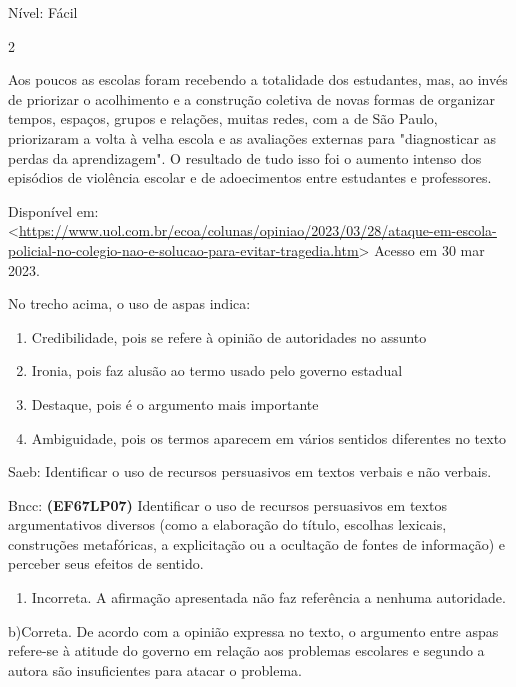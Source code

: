 {Nível: Fácil

\num{2}

Aos poucos as escolas foram recebendo a totalidade dos estudantes, mas,
ao invés de priorizar o acolhimento e a construção coletiva de novas
formas de organizar tempos, espaços, grupos e relações, muitas redes,
com a de São Paulo, priorizaram a volta à velha escola e as avaliações
externas para "diagnosticar as perdas da aprendizagem". O resultado de
tudo isso foi o aumento intenso dos episódios de violência escolar e de
adoecimentos entre estudantes e professores.

Disponível em:
\textless{}\href{https://www.uol.com.br/ecoa/colunas/opiniao/2023/03/28/ataque-em-escola-policial-no-colegio-nao-e-solucao-para-evitar-tragedia.htm}{\uline{https://www.uol.com.br/ecoa/colunas/opiniao/2023/03/28/ataque-em-escola-policial-no-colegio-nao-e-solucao-para-evitar-tragedia.htm}}\textgreater{}
Acesso em 30 mar 2023.

No trecho acima, o uso de aspas indica:

\begin{enumerate}
\def\labelenumi{\alph{enumi})}
\item
  Credibilidade, pois se refere à opinião de autoridades no assunto
\item
  Ironia, pois faz alusão ao termo usado pelo governo estadual
\item
  Destaque, pois é o argumento mais importante
\item
  Ambiguidade, pois os termos aparecem em vários sentidos diferentes no
  texto
\end{enumerate}

Saeb: Identificar o uso de recursos persuasivos em textos verbais e não
verbais.

Bncc: \textbf{(EF67LP07)} Identificar o uso de recursos persuasivos em
textos argumentativos diversos (como a elaboração do título, escolhas
lexicais, construções metafóricas, a explicitação ou a ocultação de
fontes de informação) e perceber seus efeitos de sentido.

\begin{enumerate}
\def\labelenumi{\arabic{enumi}.}
\tightlist
\item
  Incorreta. A afirmação apresentada não faz referência a nenhuma
  autoridade.
\end{enumerate}

b)Correta. De acordo com a opinião expressa no texto, o argumento entre
aspas refere-se à atitude do governo em relação aos problemas escolares
e segundo a autora são insuficientes para atacar o problema.

}
